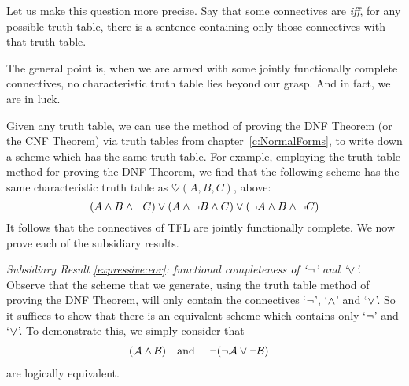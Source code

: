 Let us make this question more precise. Say that some connectives are  \emph{iff}, for any possible truth table, there is a sentence containing only those connectives with that truth table.


The general point is, when we are armed with some jointly functionally complete connectives, no characteristic truth table lies beyond our grasp. And in fact, we are in luck.

Given any truth table, we can use the method of proving the DNF Theorem (or the CNF Theorem) via truth tables from chapter~\ref{c:NormalForms}, to write down a scheme which has the same truth table. For example, employing the truth table method for proving the DNF Theorem, we find that the following scheme has the same characteristic truth table as $\heartsuit(A,B,C)$, above:
		$$(A \wedge B \wedge \neg C) \vee (A \wedge \neg B \wedge C) \vee (\neg A \wedge B \wedge \neg C)$$			
It follows that the connectives of TFL are jointly functionally complete. We now prove each of the subsidiary results.
	
\emph{Subsidiary Result \ref{expressive:eor}: functional completeness of `$\neg$' and `$\vee$'.} Observe that the scheme that we generate, using the truth table method of proving the DNF Theorem, will only contain the connectives `$\neg$', `$\wedge$' and `$\vee$'. So it suffices to show that there is an equivalent scheme which contains only `$\neg$' and `$\vee$'. To demonstrate this, we simply consider that
		\begin{align*}
		(\mathcal{A} \wedge \mathcal{B}) & \text{\quad and \quad} \neg(\neg \mathcal{A} \vee\neg \mathcal{B})
		\end{align*}
		are logically equivalent.

